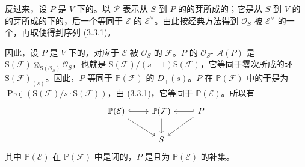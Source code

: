反过来，设 $P$ 是 $V$ 下的。以 $\mathcal P$ 表示从 $S$ 到 $P$ 的的芽所成的；它是从 $S$ 到 $V$ 的的芽所成的下的，后一个等同于 $\mathcal E$ 的 $\mathcal E^\vee$。由此按经典方法得到 $\mathcal O_S$ 被 $\mathcal E^\vee$ 的一个，再取便得到序列 (3.3.1)。

因此，设 $P$ 是 $V$ 下的，对应于 $\mathcal E$ 被 $\mathcal O_S$ 的 $\mathcal F$。$P$ 的 $\mathcal O_S$- $\mathcal A(P)$ 是 $\mathrm S(\mathcal F)\otimes_{\mathrm S(\mathcal O_S)}\mathcal O_S$，也就是 $\mathrm S(\mathcal F)/(s-1)\mathrm S(\mathcal F)$，它等同于零次所成的环 $\mathrm S(\mathcal F)_{(s)}$。因此，$P$ 等同于 $\mathbb P(\mathcal F)$ 的 $D_+(s)$。$P$ 在 $\mathbb P(\mathcal F)$ 中的于是为 $\operatorname{Proj}(\mathrm S(\mathcal F)/s\cdot\mathrm S(\mathcal F))$，由 (3.3.1)，它等同于 $\mathbb P(\mathcal E)$。所以有
\[
\begin{tikzcd}
\mathbb P(\mathcal E)\arrow[r,hook]\arrow[dr]&\mathbb P(\mathcal F)\arrow[d]&P\arrow[l,hook']\arrow[dl]\\
&S&
\end{tikzcd}
\]
其中 $\mathbb P(\mathcal E)$ 在 $\mathbb P(\mathcal F)$ 中是闭的，$P$ 是且为 $\mathbb P(\mathcal E)$ 的补集。

